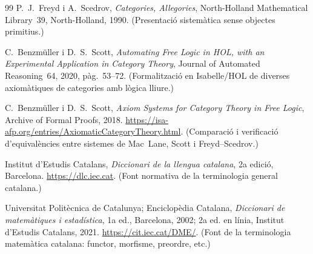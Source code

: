 \begin{thebibliography}{99}
P.~J.~Freyd i A.~Scedrov,
\emph{Categories, Allegories},
North-Holland Mathematical Library~39, North-Holland, 1990.
\newblock (Presentació sistemàtica sense objectes primitius.)

C.~Benzmüller i D.~S.~Scott,
\emph{Automating Free Logic in HOL, with an Experimental Application in Category Theory},
Journal of Automated Reasoning~64, 2020, pàg.~53--72.
\newblock (Formalització en Isabelle/HOL de diverses axiomàtiques de categories amb lògica lliure.)

C.~Benzmüller i D.~S.~Scott,
\emph{Axiom Systems for Category Theory in Free Logic},
Archive of Formal Proofs, 2018. \url{https://isa-afp.org/entries/AxiomaticCategoryTheory.html}.
\newblock (Comparació i verificació d'equivalències entre sistemes de Mac~Lane, Scott i Freyd--Scedrov.)

Institut d'Estudis Catalans,
\emph{Diccionari de la llengua catalana},
2a edició, Barcelona. \url{https://dlc.iec.cat}.
\newblock (Font normativa de la terminologia general catalana.)

Universitat Politècnica de Catalunya; Enciclopèdia Catalana,
\emph{Diccionari de matemàtiques i estadística},
1a ed., Barcelona, 2002; 2a ed. en línia, Institut d'Estudis Catalans, 2021. \url{https://cit.iec.cat/DME/}.
\newblock (Font de la terminologia matemàtica catalana: functor, morfisme, preordre, etc.)

\end{thebibliography}
